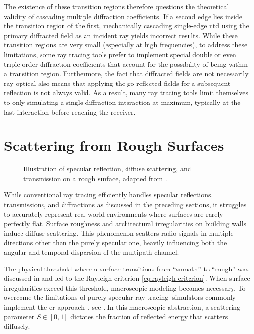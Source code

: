 The existence of these transition regions therefore questions the theoretical validity of cascading multiple diffraction coefficients. If a second edge lies inside the transition region of the first, mechanically cascading single-edge \gls{utd} using the primary diffracted field as an incident ray yields incorrect results. While these transition regions are very small (especially at high frequencies), to address these limitations, some ray tracing tools prefer to implement special double or even triple-order diffraction coefficients that account for the possibility of being within a transition region. Furthermore, the fact that diffracted fields are not necessarily ray-optical also means that applying the \gls{go} reflected fields for a subsequent reflection is not always valid. As a result, many ray tracing tools limit themselves to only simulating a single diffraction interaction at maximum, typically at the last interaction before reaching the receiver.

\section{Scattering from Rough Surfaces}

\begin{figure}
  \centering
  \caption{Illustration of specular reflection, diffuse scattering, and transmission on a rough surface, adapted from \cite[Fig.~2]{DegliEsposti2022}.}
\end{figure}

While conventional ray tracing efficiently handles specular reflections, transmissions, and diffractions as discussed in the preceding sections, it struggles to accurately represent real-world environments where surfaces are rarely perfectly flat. Surface roughness and architectural irregularities on building walls induce diffuse scattering. This phenomenon scatters radio signals in multiple directions other than the purely specular one, heavily influencing both the angular and temporal dispersion of the multipath channel.

The physical threshold where a surface transitions from \enquote{smooth} to \enquote{rough} was discussed in  and led to the Rayleigh criterion \eqref{eq:rayleigh-criterion}. When surface irregularities exceed this threshold, macroscopic modeling becomes necessary. To overcome the limitations of purely specular ray tracing, simulators commonly implement the \gls{er} approach~, see . In this macroscopic abstraction, a scattering parameter $S \in [0, 1]$ dictates the fraction of reflected energy that scatters diffusely.

